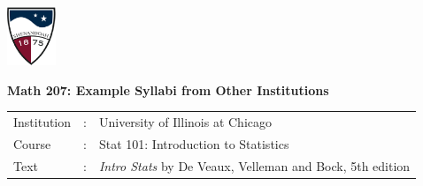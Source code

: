 \documentclass[10pt]{article}
\begin{document}
\vfill
\eject

\href{http://www.su.edu}{\includegraphics[height=1.75cm]{sulogo.eps}}
\vspace{-1.69cm}


\begin{center}
  \textbf{\large Math 207: Example Syllabi from Other Institutions}
\bigskip\bigskip
\end{center}


\begin{tabular}{lcl}
Institution & : & University of Illinois at Chicago\\
Course      & : & Stat 101:  Introduction to Statistics\\
Text        & : & \textit{Intro Stats} by De Veaux, Velleman and Bock, 5th edition\\
\end{tabular}
\bigskip

\vfill
\eject
\end{document}
